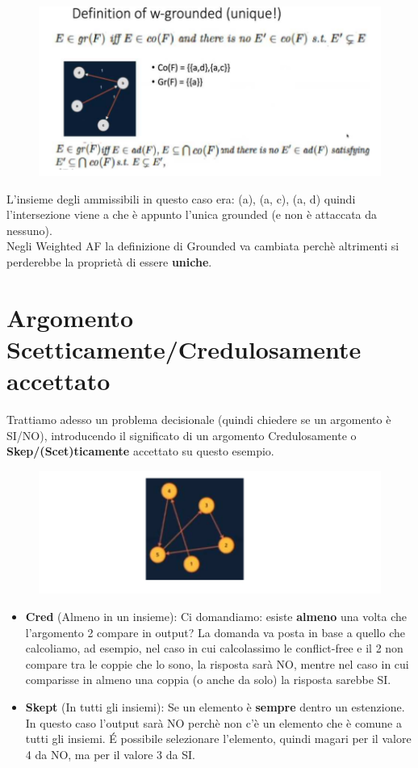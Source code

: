 \begin{figure}[htp]
	\centering
    \includegraphics[width=12cm, keepaspectratio]{img/Cap6/w-gounded2.png}
\end{figure}
L’insieme degli ammissibili in questo caso era: (a), (a, c), (a, d) quindi l’intersezione viene a che è appunto l’unica grounded (e non è attaccata da nessuno).
\\Negli Weighted AF la definizione di Grounded va cambiata perchè altrimenti si perderebbe la proprietà di essere \textbf{uniche}.
\section{Argomento Scetticamente/Credulosamente accettato}
Trattiamo adesso un problema decisionale (quindi chiedere se un argomento è SI/NO), introducendo il significato di un argomento Credulosamente o \textbf{Skep/(Scet)ticamente }accettato su questo esempio.
\begin{figure}[htp]
	\centering
    \includegraphics[width=12cm, keepaspectratio]{img/Cap6/scet.png}
\end{figure}
\begin{itemize}
    \item \textbf{Cred} (Almeno in un insieme): Ci domandiamo: esiste \textbf{almeno} una volta che l’argomento 2 compare in output? La domanda va posta in base a quello che calcoliamo, ad esempio, nel caso in cui calcolassimo le conflict-free e il 2 non compare tra le coppie che lo sono, la risposta sarà NO, mentre nel caso in cui comparisse in almeno una coppia (o anche da solo) la risposta sarebbe SI.
    \item \textbf{Skept} (In tutti gli insiemi): Se un elemento è \textbf{sempre} dentro un estenzione. In questo caso l’output sarà NO perchè non c’è un elemento che è comune a tutti gli insiemi. É possibile selezionare l’elemento, quindi magari per il valore 4 da NO, ma per il valore 3 da SI.
\end{itemize}

